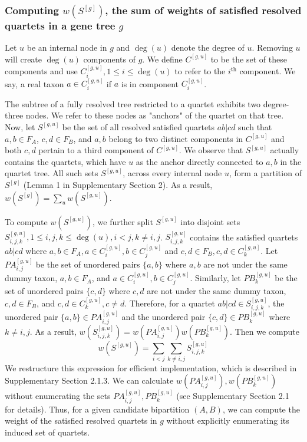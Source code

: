 \documentclass[11pt]{article}
\begin{document}
\subsubsection*{Computing $w(S^{[g]})$, the sum of weights of satisfied resolved quartets in a gene tree $g$}

Let $u$ be an internal node in $g$ and $\deg(u)$ denote the degree of $u$. Removing $u$ will create $\deg(u)$ components of $g$. We define $C^{[g,u]}$ to be the set of these components and use $C_i^{[g,u]}, 1 \leq i \leq \deg(u)$ to refer to the $i^{\text{th}}$ component. We say, a real taxon $a \in C_i^{[g,u]}$ if $a$ is in component $C_i^{[g,u]}$.

The subtree of a fully resolved tree restricted to a quartet exhibits two degree-three nodes. We refer to these nodes as "anchors" of the quartet on that tree. Now, let $S^{[g,u]}$ be the set of all resolved satisfied quartets $ab|cd$ such that $a, b \in F_A$, $c, d \in F_B$, and $a, b$ belong to two distinct components in $C^{[g,u]}$ and both $c, d$ pertain to a third component of $C^{[g,u]}$. We observe that $S^{[g,u]}$ actually contains the quartets, which have $u$ as the anchor directly connected to $a, b$ in the quartet tree. All such sets $S^{[g,u]}$, across every internal node $u$, form a partition of $S^{[g]}$ (Lemma 1 in Supplementary Section 2). As a result, $w(S^{[g]}) = \sum_u w(S^{[g,u]})$.

To compute $w(S^{[g,u]})$, we further split $S^{[g,u]}$ into disjoint sets $S_{i,j,k}^{[g,u]}, 1 \leq i, j, k \leq \deg(u), i < j, k \neq i, j$. $S_{i,j,k}^{[g,u]}$ contains the satisfied quartets $ab|cd$ where $a, b \in F_A, a \in C_i^{[g,u]}, b \in C_j^{[g,u]}$ and $c, d \in F_B, c, d \in C_k^{[g,u]}$. Let $PA_{i,j}^{[g,u]}$ be the set of unordered pairs $\{a, b\}$ where $a, b$ are not under the same dummy taxon, $a, b \in F_A$, and $a \in C_i^{[g,u]}, b \in C_j^{[g,u]}$. Similarly, let $PB_k^{[g,u]}$ be the set of unordered pairs $\{c, d\}$ where $c, d$ are not under the same dummy taxon, $c, d \in F_B$, and $c, d \in C_k^{[g,u]}, c \neq d$. Therefore, for a quartet $ab|cd \in S_{i,j,k}^{[g,u]}$, the unordered pair $\{a, b\} \in PA_{i,j}^{[g,u]}$ and the unordered pair $\{c, d\} \in PB_k^{[g,u]}$ where $k \neq i, j$. As a result, $w(S_{i,j,k}^{[g,u]}) = w(PA_{i,j}^{[g,u]}) w(PB_k^{[g,u]})$. Then we compute
\[
w(S^{[g,u]}) = \sum_{i < j} \sum_{k \neq i, j} S_{i,j,k}^{[g,u]}
\]
We restructure this expression for efficient implementation, which is described in Supplementary Section 2.1.3. We can calculate $w(PA_{i,j}^{[g,u]}), w(PB_k^{[g,u]})$ without enumerating the sets $PA_{i,j}^{[g,u]}, PB_k^{[g,u]}$ (see Supplementary Section 2.1 for details). Thus, for a given candidate bipartition $(A, B)$, we can compute the weight of the satisfied resolved quartets in $g$ without explicitly enumerating its induced set of quartets.
\end{document}
